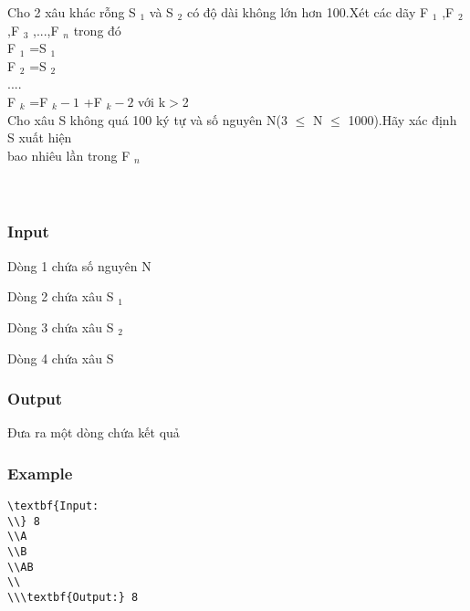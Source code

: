 



   Cho 2 xâu khác rỗng S   $_    1   $   và S   $_    2   $   có độ dài không lớn hơn 100.Xét các dãy F   $_    1   $   ,F   $_    2   $   ,F   $_    3   $   ,...,F   $_    n   $   trong đó   
\\   F   $_    1   $   =S   $_    1   $
\\   F   $_    2   $   =S   $_    2   $
\\   ....   
\\   F   $_    k   $   =F   $_    k-1   $   +F   $_    k-2   $   với k$>$2   
\\   Cho xâu S không quá 100 ký tự và số nguyên N(3 $\le$ N $\le$ 1000).Hãy xác định S xuất hiện   
\\   bao nhiêu lần trong F   $_    n   $
\\
\\
\\

\subsubsection{   Input  }

   Dòng 1 chứa số nguyên N  

   Dòng 2 chứa xâu S   $_    1   $

   Dòng 3 chứa xâu S   $_    2   $

   Dòng 4 chứa xâu S  

\subsubsection{   Output  }

   Đưa ra một dòng chứa kết quả  

\subsubsection{   Example  }
\begin{verbatim}
\textbf{Input:
\\} 8
\\A
\\B
\\AB
\\
\\\textbf{Output:} 8 \end{verbatim}
